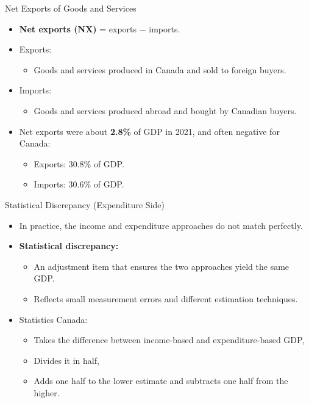 \documentclass[aspectratio=169]{beamer}
\begin{document}
\begin{frame}{Net Exports of Goods and Services}
\transfade
\begin{itemize}[<+->]
  \item \textbf{Net exports (NX)} = exports \(-\) imports.
  \item Exports:
  \begin{itemize}[<+->]
    \item Goods and services produced in Canada and sold to foreign buyers.
  \end{itemize}
  \item Imports:
  \begin{itemize}[<+->]
    \item Goods and services produced abroad and bought by Canadian buyers.
  \end{itemize}
  \item Net exports were about \textbf{2.8\%} of GDP in 2021, and often \alert{negative} for Canada:
  \begin{itemize}[<+->]
    \item Exports: 30.8\% of GDP.
    \item Imports: 30.6\% of GDP.
  \end{itemize}
\end{itemize}
\end{frame}

\begin{frame}{Statistical Discrepancy (Expenditure Side)}
\transfade
\begin{itemize}[<+->]
  \item In practice, the income and expenditure approaches do not match perfectly.
  \item \textbf{Statistical discrepancy:}
  \begin{itemize}[<+->]
    \item An adjustment item that ensures the two approaches yield the same GDP.
    \item Reflects small measurement errors and different estimation techniques.
  \end{itemize}
  \item Statistics Canada:
  \begin{itemize}[<+->]
    \item Takes the difference between income-based and expenditure-based GDP,
    \item Divides it in half,
    \item Adds one half to the lower estimate and subtracts one half from the higher.
  \end{itemize}
\end{itemize}
\end{frame}
\end{document}
